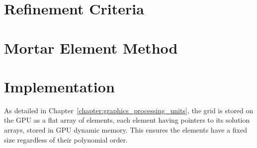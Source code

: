 \section{Refinement Criteria} \label{section:adaptive_mesh_refinement:refinement_criteria}

\cite{Mavriplis1990}

\section{Mortar Element Method} \label{section:adaptive_mesh_refinement:mortar_element_method}

\cite{Maday1989}

\section{Implementation} \label{section:adaptive_mesh_refinement:implementation}

As detailed in Chapter~\ref{chapter:graphics_processing_units}, the grid is stored on the GPU as a
flat array of elements, each element having pointers to its solution arrays, stored in GPU dynamic
memory. This ensures the elements have a fixed size regardless of their polynomial order.